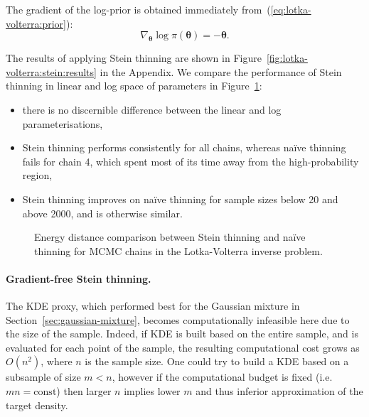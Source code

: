 \documentclass[11pt,a4paper]{report}
\begin{document}
The gradient of the log-prior is obtained immediately from~(\ref{eq:lotka-volterra:prior}):
\begin{equation*}
\nabla_{\pmb{\theta}} \log \pi(\pmb{\theta}) = -\pmb{\theta}.
\end{equation*}

The results of applying Stein thinning are shown in Figure~\ref{fig:lotka-volterra:stein:results} in the Appendix. We compare the performance of Stein thinning in linear and log space of parameters in Figure~\ref{fig:lotka-volterra:stein-thinning:energy-distance}:
\begin{itemize}
\item there is no discernible difference between the linear and log parameterisations,
\item Stein thinning performs consistently for all chains, whereas na\"ive thinning fails for chain 4, which spent most of its time away from the high-probability region,
\item Stein thinning improves on na\"ive thinning for sample sizes below 20 and above 2000, and is otherwise similar.
\end{itemize}

\begin{figure}[h]
\centering
{}
\caption{Energy distance comparison between Stein thinning and na\"ive thinning for MCMC chains in the Lotka-Volterra inverse problem.
\label{fig:lotka-volterra:stein-thinning:energy-distance}}
\end{figure}

\paragraph{Gradient-free Stein thinning.} The KDE proxy, which performed best for the Gaussian mixture in Section~\ref{sec:gaussian-mixture}, becomes computationally infeasible here due to the size of the sample. Indeed, if KDE is built based on the entire sample, and is evaluated for each point of the sample, the resulting computational cost grows as $O(n^2)$, where $n$ is the sample size. One could try to build a KDE based on a subsample of size $m < n$, however if the computational budget is fixed (i.e. $mn = \text{const}$) then larger $n$ implies lower $m$ and thus inferior approximation of the target density.
\end{document}
